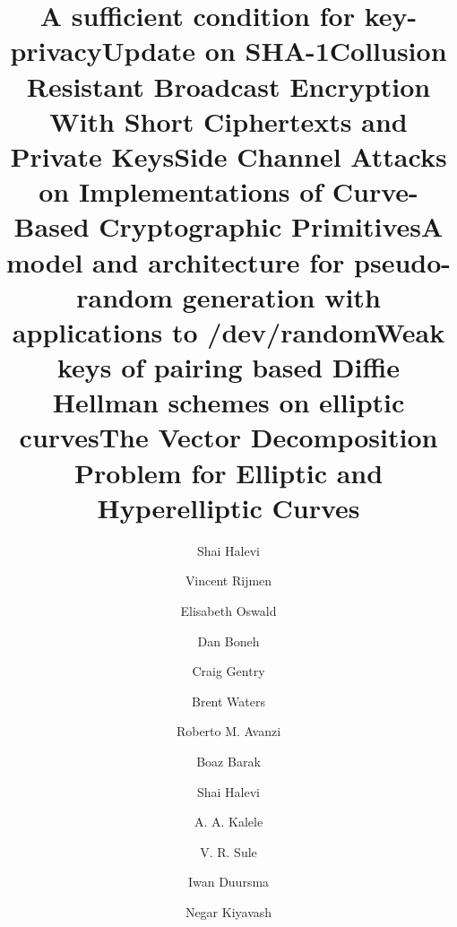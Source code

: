 \documentclass{llncs}
\begin{document}
\setcounter{page}{94}
\title{A sufficient condition for key-privacy}
\author{Shai Halevi}
\maketitle
\clearpage

\setcounter{page}{115}
\title{Update on SHA-1}
\author{Vincent Rijmen \and  Elisabeth Oswald}
\maketitle
\clearpage

\setcounter{page}{131}
\title{Collusion Resistant Broadcast Encryption With Short Ciphertexts and Private Keys}
\author{Dan Boneh \and  Craig Gentry  \and  Brent Waters}
\maketitle
\clearpage

\setcounter{page}{148}
\title{Side Channel Attacks on Implementations of Curve-Based Cryptographic Primitives}
\author{Roberto M. Avanzi}
\maketitle
\clearpage

\setcounter{page}{161}
\title{A model and architecture for pseudo-random generation with applications to /dev/random}
\author{Boaz Barak \and  Shai Halevi}
\maketitle
\clearpage

\setcounter{page}{180}
\title{Weak keys of pairing based Diffie Hellman schemes on elliptic curves}
\author{A. A. Kalele \and  V. R. Sule}
\maketitle
\clearpage

\setcounter{page}{200}
\title{The Vector Decomposition Problem for Elliptic and Hyperelliptic Curves}
\author{Iwan Duursma \and  Negar Kiyavash}
\maketitle
\clearpage

\setcounter{page}{210}


\renewcommand{\indexname}{Author Index}
\printindex
\end{document}
